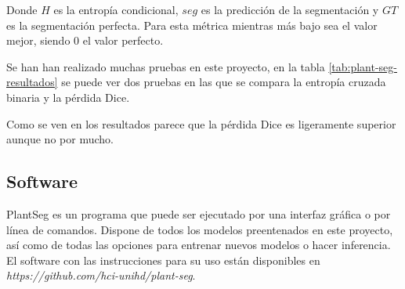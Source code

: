 Donde $H$ es la entropía condicional, $seg$ es la predicción de la segmentación y $GT$ es la segmentación perfecta. Para esta métrica mientras más bajo sea el valor mejor, siendo 0 el valor perfecto.

Se han han realizado muchas pruebas en este proyecto, en la tabla \ref{tab:plant-seg-resultados} se puede ver dos pruebas en las que se compara la entropía cruzada binaria y la pérdida Dice.


Como se ven en los resultados parece que la pérdida Dice es ligeramente superior aunque no por mucho.

\subsection{Software}\label{app2_software}

PlantSeg es un programa que puede ser ejecutado por una interfaz gráfica o por línea de comandos. Dispone de todos los modelos preentenados en este proyecto, así como de todas las opciones para entrenar nuevos modelos o hacer inferencia. El software con las instrucciones para su uso están disponibles en \textit{https://github.com/hci-unihd/plant-seg}.


